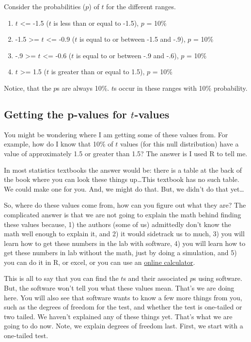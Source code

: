 \documentclass[
  letterpaper,
  DIV=11,
  numbers=noendperiod]{scrreprt}
\providecommand{\tightlist}{%
  \setlength{\itemsep}{0pt}\setlength{\parskip}{0pt}}
\begin{document}
Consider the probabilities (\(p\)) of \(t\) for the different ranges.

\begin{enumerate}
\def\labelenumi{\arabic{enumi}.}
\tightlist
\item
  \(t\) \textless= -1.5 (\(t\) is less than or equal to -1.5), \(p\) =
  10\%
\item
  -1.5 \textgreater= \(t\) \textless= -0.9 (\(t\) is equal to or between
  -1.5 and -.9), \(p\) = 10\%
\item
  -.9 \textgreater= \(t\) \textless= -0.6 (\(t\) is equal to or between
  -.9 and -.6), \(p\) = 10\%
\item
  \(t\) \textgreater= 1.5 (\(t\) is greater than or equal to 1.5), \(p\)
  = 10\%
\end{enumerate}

Notice, that the \(p\)s are always 10\%. \(t\)s occur in these ranges
with 10\% probability.

\subsection{\texorpdfstring{Getting the p-values for
\(t\)-values}{Getting the p-values for t-values}}\label{getting-the-p-values-for-t-values}

You might be wondering where I am getting some of these values from. For
example, how do I know that 10\% of \(t\) values (for this null
distribution) have a value of approximately 1.5 or greater than 1.5? The
answer is I used R to tell me.

In most statistics textbooks the answer would be: there is a table at
the back of the book where you can look these things up\ldots This
textbook has no such table. We could make one for you. And, we might do
that. But, we didn't do that yet\ldots{}

So, where do these values come from, how can you figure out what they
are? The complicated answer is that we are not going to explain the math
behind finding these values because, 1) the authors (some of us)
admittedly don't know the math well enough to explain it, and 2) it
would sidetrack us to much, 3) you will learn how to get these numbers
in the lab with software, 4) you will learn how to get these numbers in
lab without the math, just by doing a simulation, and 5) you can do it
in R, or excel, or you can use an
\href{http://www.socscistatistics.com/pvalues/tdistribution.aspx}{online
calculator}.

This is all to say that you can find the \(t\)s and their associated
\(p\)s using software. But, the software won't tell you what these
values mean. That's we are doing here. You will also see that software
wants to know a few more things from you, such as the degrees of freedom
for the test, and whether the test is one-tailed or two tailed. We
haven't explained any of these things yet. That's what we are going to
do now. Note, we explain degrees of freedom last. First, we start with a
one-tailed test.
\end{document}

